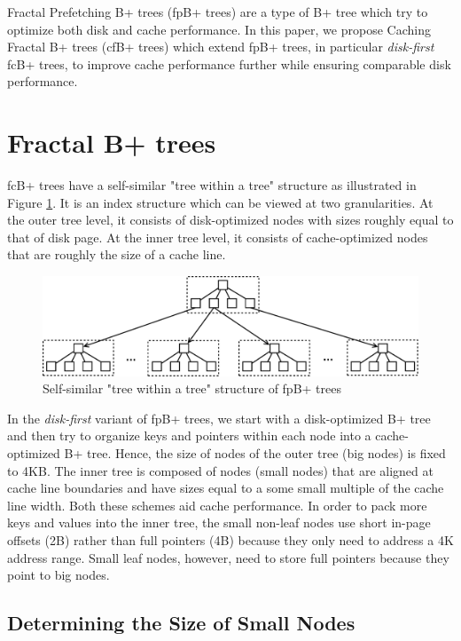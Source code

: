 \documentclass{article}
\begin{document}
Fractal Prefetching B+ trees (fpB+ trees) are a type of B+ tree which try to optimize both disk and cache performance. In this paper, we propose Caching Fractal B+ trees (cfB+ trees) which extend fpB+ trees, in particular \textit{disk-first} fcB+ trees, to improve cache performance further while ensuring comparable disk performance.

\section{Fractal B+ trees}

fcB+ trees have a self-similar "tree within a tree" structure as illustrated in Figure \ref{fig:inner_block}. It is an index structure which can be viewed at two granularities. At the outer tree level, it consists of disk-optimized nodes with sizes roughly equal to that of disk page. At the inner tree level, it consists of cache-optimized nodes that are roughly the size of a cache line.

\begin{figure}[h]
\begin{center}
\includegraphics[width=350pt]{fb+tree_struct}
\end{center}
\caption{
Self-similar "tree within a tree" structure of fpB+ trees
}
\label{fig:inner_block}
\end{figure}

In the \textit{disk-first} variant of fpB+ trees, we start with a disk-optimized B+ tree and then try to organize keys and pointers within each node into a cache-optimized B+ tree. Hence, the size of nodes of the outer tree (big nodes) is fixed to 4KB. The inner tree is composed of nodes (small nodes) that are aligned at cache line boundaries and have sizes equal to a some small multiple of the cache line width. Both these schemes aid cache performance. In order to pack more keys and values into the inner tree, the small non-leaf nodes use short in-page offsets (2B) rather than full pointers (4B) because they only need to address a 4K address range. Small leaf nodes, however, need to store full pointers because they point to big nodes.

\subsection{Determining the Size of Small Nodes}
\end{document}
